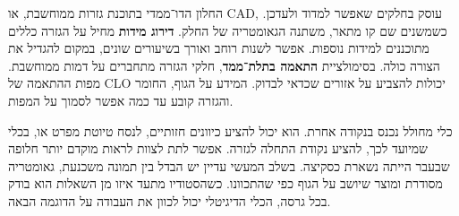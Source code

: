 

\vspace{6mm}

{\fontsize{15}{23.2}\selectfont

החלון הדו־ממדי בתוכנת גזרות ממוחשבת, או \textenglish{CAD}, עוסק בחלקים שאפשר למדוד ולעדכן. כשמשנים שם קו מתאר, משתנה הגאומטריה של החלק. \textbf{דירוג מידות} מחיל על הגזרה כללים מתוכננים למידות נוספות. אפשר לשנות רוחב ואורך בשיעורים שונים, במקום להגדיל את הצורה כולה. בסימולציית \textbf{התאמה בתלת־ממד}, חלקי הגזרה מתחברים על דמות ממוחשבת. מפות ההתאמה של \textenglish{CLO} יכולות להצביע על אזורים שכדאי לבדוק. המידע על הגוף, החומר והגזרה קובע עד כמה אפשר לסמוך על המפות. 

כלי מחולל נכנס בנקודה אחרת. הוא יכול להציע כיוונים חזותיים, לנסח טיוטת מפרט או, בכלי שמיועד לכך, להציע נקודת התחלה לגזרה. אפשר לתת לצוות לראות מוקדם יותר חלופה שבעבר הייתה נשארת כסקיצה. בשלב המעשי עדיין יש הבדל בין תמונה משכנעת, גאומטריה מסודרת ומוצר שיושב על הגוף כפי שהתכוונו. כשהסטודיו מתעד איזו מן השאלות הוא בודק בכל גרסה, הכלי הדיגיטלי יכול לכוון את העבודה על הדוגמה הבאה. 

\par}
